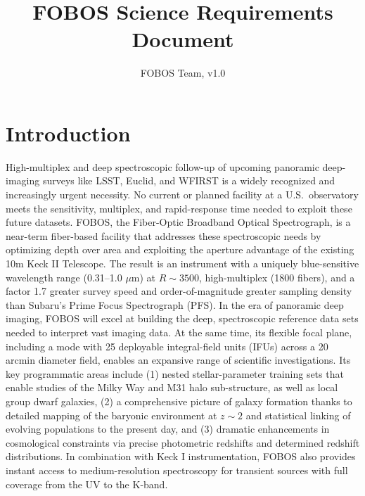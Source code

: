 \documentclass[preprint,11pt]{aastex}
\title{FOBOS Science Requirements Document}
\author{FOBOS Team, v1.0}
\begin{document}
\maketitle


\setcounter{tocdepth}{3}
\setcounter{secnumdepth}{3}
\tableofcontents


\section{Introduction}
\label{srd:intro}

High-multiplex and deep spectroscopic follow-up of upcoming panoramic deep-imaging surveys like LSST, Euclid, and
WFIRST is a widely recognized and increasingly urgent necessity. No current or planned facility at a U.S.~observatory
meets the sensitivity, multiplex, and rapid-response time needed to exploit these future datasets. FOBOS, the
Fiber-Optic Broadband Optical Spectrograph, is a near-term fiber-based facility that addresses these spectroscopic
needs by optimizing depth over area and exploiting the aperture advantage of the existing 10m Keck II Telescope. The
result is an instrument with a uniquely blue-sensitive wavelength range (0.31--1.0 $\mu$m) at $R \sim 3500$,
high-multiplex (1800 fibers), and a factor 1.7 greater survey speed and order-of-magnitude greater sampling density
than Subaru's Prime Focus Spectrograph (PFS). In the era of panoramic deep imaging, FOBOS will excel at building the
deep, spectroscopic reference data sets needed to interpret vast imaging data. At the same time, its flexible focal
plane, including a mode with 25 deployable integral-field units (IFUs) across a 20 arcmin diameter field, enables an
expansive range of scientific investigations. Its key programmatic areas include (1) nested stellar-parameter training
sets that enable studies of the Milky Way and M31 halo sub-structure, as well as local group dwarf galaxies, (2) a
comprehensive picture of galaxy formation thanks to detailed mapping of the baryonic environment at $z \sim 2$ and
statistical linking of evolving populations to the present day, and (3) dramatic enhancements in cosmological
constraints via precise photometric redshifts and determined redshift distributions.  In combination with Keck I
instrumentation, FOBOS also provides instant access to medium-resolution spectroscopy for transient sources with full
coverage from the UV to the K-band.
\end{document}
